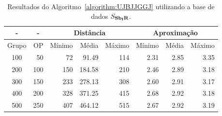\begin{table}[!htb]
  \caption{Resultados do Algoritmo~\ref{algorithm:UJBJJGGJ} utilizando a base de dados $S_{\textbf{Sb\textsubscript{I}R}}{}$.}
  \label{table:PPPESHDE}
  \centering
  \begin{tabular}{|c|r|r|r|r|r|r|r|}
    \hline
    -      & \multicolumn{1}{c|}{-} & \multicolumn{3}{c|}{Distância}             & \multicolumn{3}{c|}{Aproximação}           \\ \hline
    Grupo  & OP                     & Mínimo       & Média        & Máximo       & Mínimo       & Média        & Máximo       \\ \hline  
    100    & 50                     & 72           &  91.49       & 114          & 2.31         & 2.85         & 3.35         \\ \hline
    200    & 100                    & 150          & 184.58       & 210          & 2.46         & 2.89         & 3.18         \\ \hline
    300    & 150                    & 233          & 278.13       & 308          & 2.60         & 2.91         & 3.17         \\ \hline
    400    & 200                    & 328          & 371.25       & 415          & 2.68         & 2.92         & 3.18         \\ \hline
    500    & 250                    & 407          & 464.12       & 515          & 2.67         & 2.92         & 3.19         \\ \hline    
  \end{tabular}
\end{table}